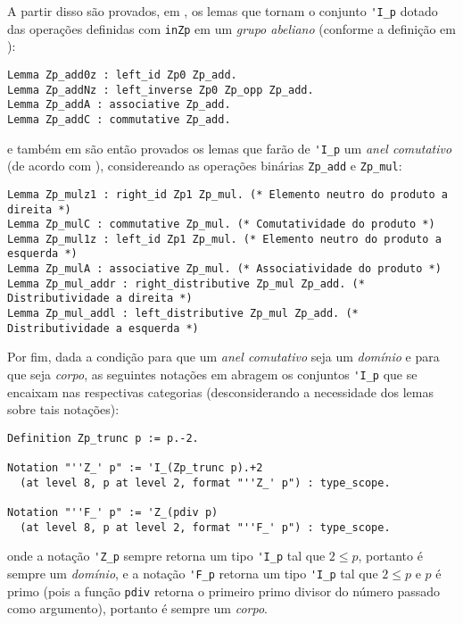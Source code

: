 A partir disso são provados, em \cite{mathcomp-zmodp}, os lemas que tornam o conjunto \lstinline[language = coq]{'I_p} dotado das operações definidas com \lstinline[language = coq]{inZp} em um \textit{grupo abeliano} (conforme a definição em \cite[p.~41-46]{book:2399854}):
    \begin{lstlisting}[language=coq,frame=single,tabsize=1]
Lemma Zp_add0z : left_id Zp0 Zp_add.
Lemma Zp_addNz : left_inverse Zp0 Zp_opp Zp_add.
Lemma Zp_addA : associative Zp_add.
Lemma Zp_addC : commutative Zp_add.
    \end{lstlisting}
e também em \cite{mathcomp-zmodp} são então provados os lemas que farão de \lstinline[language = coq]{'I_p} um \textit{anel comutativo} (de acordo com \cite[p.~46-47]{book:2399854}), considereando as operações binárias \lstinline[language = coq]{Zp_add} e \lstinline[language = coq]{Zp_mul}:
    \begin{lstlisting}[language=coq,frame=single,tabsize=1]
Lemma Zp_mulz1 : right_id Zp1 Zp_mul. (* Elemento neutro do produto a direita *)
Lemma Zp_mulC : commutative Zp_mul. (* Comutatividade do produto *)
Lemma Zp_mul1z : left_id Zp1 Zp_mul. (* Elemento neutro do produto a esquerda *)
Lemma Zp_mulA : associative Zp_mul. (* Associatividade do produto *)
Lemma Zp_mul_addr : right_distributive Zp_mul Zp_add. (* Distributividade a direita *)
Lemma Zp_mul_addl : left_distributive Zp_mul Zp_add. (* Distributividade a esquerda *)
    \end{lstlisting}
Por fim, dada a condição para que um \textit{anel comutativo} seja um \textit{domínio} e para que seja \textit{corpo}, as seguintes notações em \cite{mathcomp-zmodp} abragem os conjuntos \lstinline[language=coq]|'I_p| que se encaixam nas respectivas categorias (desconsiderando a necessidade dos lemas sobre tais notações):
    \begin{lstlisting}[language=coq,frame=single,tabsize=1]
Definition Zp_trunc p := p.-2.

Notation "''Z_' p" := 'I_(Zp_trunc p).+2
  (at level 8, p at level 2, format "''Z_' p") : type_scope.
  
Notation "''F_' p" := 'Z_(pdiv p)
  (at level 8, p at level 2, format "''F_' p") : type_scope.
    \end{lstlisting}
onde a notação \lstinline[language=coq]|'Z_p| sempre retorna um tipo \lstinline[language=coq]|'I_p| tal que $2 \leq p$, portanto é sempre um \textit{domínio}, e a notação \lstinline[language=coq]|'F_p| retorna um tipo \lstinline[language=coq]|'I_p| tal que $2 \leq p$ e $p$ é primo (pois a função \lstinline[language=coq]|pdiv| retorna o primeiro primo divisor do número passado como argumento), portanto é sempre um \textit{corpo}.


